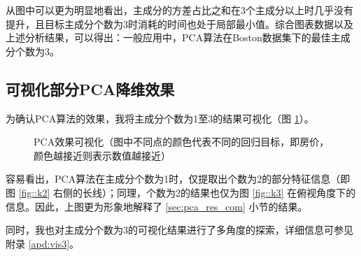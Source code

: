 \documentclass[12pt,a4paper]{article}
\theoremstyle{definition}
\begin{document}
从图中可以更为明显地看出，主成分的方差占比之和在3个主成分以上时几乎没有提升，且目标主成分个数为3时消耗的时间也处于局部最小值。综合图表数据以及上述分析结果，可以得出：一般应用中，PCA算法在Boston数据集下的最佳主成分个数为3。

\subsection{可视化部分PCA降维效果}

为确认PCA算法的效果，我将主成分个数为1至3的结果可视化（图 \ref{fig:pca_vis}）。

\begin{figure}[H]
	\centering
	\caption{PCA效果可视化（图中不同点的颜色代表不同的回归目标，即房价，颜色越接近则表示数值越接近）}
	\label{fig:pca_vis}
\end{figure}

容易看出，PCA算法在主成分个数为1时，仅提取出个数为2的部分特征信息（即图 \ref{fig::k2} 右侧的长线）；同理，个数为2的结果也仅为图 \ref{fig::k3} 在俯视角度下的信息。因此，上图更为形象地解释了 \ref{sec:pca_res_com} 小节的结果。

同时，我也对主成分个数为3的可视化结果进行了多角度的探索，详细信息可参见附录 \ref{apd:vis3}。
\end{document}
